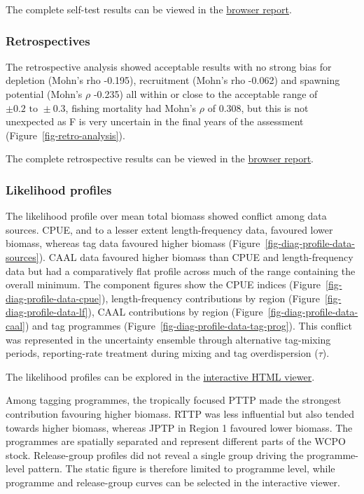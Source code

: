 \documentclass[
  english,
  a4paper,
  a4paper,
  11pt]{SCreport}
\begin{document}
The complete self-test results can be viewed in the
\href{https://pacificcommunity.github.io/ofp-sam-bet-2026-selftest/selftest-report.html}{browser
report}.

\subsubsection{Retrospectives}\label{sec-retro-analysis}

The retrospective analysis showed acceptable results with no strong bias
for depletion (Mohn's rho -0.195), recruitment (Mohn's rho -0.062) and
spawning potential (Mohn's \(\rho\) -0.235) all within or close to the
acceptable range of \(\pm 0.2 \text{ to } \pm 0.3\), fishing mortality
had Mohn's \(\rho\) of 0.308, but this is not unexpected as F is very
uncertain in the final years of the assessment
(Figure~\ref{fig-retro-analysis}).

The complete retrospective results can be viewed in the
\href{https://pacificcommunity.github.io/ofp-sam-bet-2026-retrospective/retrospective-report.html}{browser
report}.

\subsubsection{Likelihood profiles}\label{sec-likelihood-profile}

The likelihood profile over mean total biomass showed conflict among
data sources. CPUE, and to a lesser extent length-frequency data,
favoured lower biomass, whereas tag data favoured higher biomass
(Figure~\ref{fig-diag-profile-data-sources}). CAAL data favoured higher
biomass than CPUE and length-frequency data but had a comparatively flat
profile across much of the range containing the overall minimum. The
component figures show the CPUE indices
(Figure~\ref{fig-diag-profile-data-cpue}), length-frequency
contributions by region (Figure~\ref{fig-diag-profile-data-lf}), CAAL
contributions by region (Figure~\ref{fig-diag-profile-data-caal}) and
tag programmes (Figure~\ref{fig-diag-profile-data-tag-prog}). This
conflict was represented in the uncertainty ensemble through alternative
tag-mixing periods, reporting-rate treatment during mixing and tag
overdispersion (\(\tau\)).

The likelihood profiles can be explored in the
\href{https://pacificcommunity.github.io/ofp-sam-bet-2026-diagnostic/bet-2026-likelihood-profile-viewer.html}{interactive
HTML viewer}.

Among tagging programmes, the tropically focused PTTP made the strongest
contribution favouring higher biomass. RTTP was less influential but
also tended towards higher biomass, whereas JPTP in Region 1 favoured
lower biomass. The programmes are spatially separated and represent
different parts of the WCPO stock. Release-group profiles did not reveal
a single group driving the programme-level pattern. The static figure is
therefore limited to programme level, while programme and release-group
curves can be selected in the interactive viewer.
\end{document}
